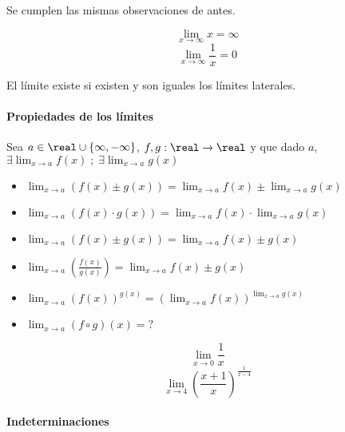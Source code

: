 \obs Se cumplen las mismas observaciones de antes.

\begin{example}
	\[\lim_{x\to\infty}x=\infty\]
	\[\lim_{x\to\infty}\frac{1}{x}=0\]
\end{example}

\begin{defn} 
	El límite existe si existen y son iguales los límites laterales. 
\end{defn}


\paragraph{Propiedades de los límites} 

Sea $a\in\real\cup\{\infty,-\infty\}$, $f,g:\real\to\real$ y que dado $a$, $\exists\lim_{x\to a}f(x) \;;\; \exists\lim_{x\to a}g(x)$
\begin{itemize}
	\item $\lim_{x\to a} \left(f(x) \pm g(x)\right) = \lim_{x\to a} f(x) \pm \lim_{x\to a} g(x)$
	\item $\lim_{x\to a} \left(f(x) · g(x)\right) = \lim_{x\to a} f(x) · \lim_{x\to a} g(x)$
	\item $\lim_{x\to a} \left(f(x) \pm g(x)\right) = \lim_{x\to a} f(x) \pm g(x)$
	\item $\lim_{x\to a} \left(\frac{f(x)}{g(x)}\right) = \lim_{x\to a} f(x) \pm g(x)$
	\item $\lim_{x\to a} \left(f(x)\right)^{g(x)} = \left(\lim_{x\to a} f(x)\right)^{\lim_{x\to a} g(x)}$	
	\item $\lim_{x\to a} (f\circ g)(x) = ?$	
\end{itemize}

\begin{example}
\[\lim_{x\to 0}\frac{1}{x}\]
 \[\lim_{x\to 4}\left(\frac{x+1}{x}\right)^{\frac{1}{x-4}}\]
\end{example}

\paragraph{Indeterminaciones}

